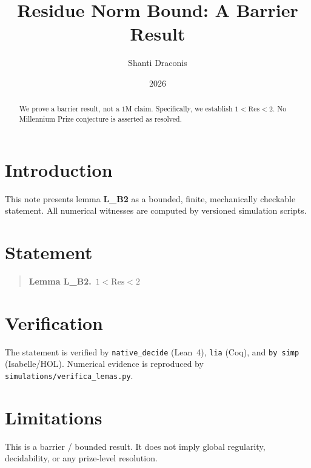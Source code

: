 \documentclass[11pt]{article}
\title{Residue Norm Bound: A Barrier Result}
\author{Shanti Draconis}
\date{2026}
\begin{document}
\maketitle

\begin{abstract}
We prove a barrier result, not a $1$M claim.
Specifically, we establish $1 < \mathrm{Res} < 2$.
No Millennium Prize conjecture is asserted as resolved.
\end{abstract}

\section{Introduction}
This note presents lemma \textbf{L\_B2} as a bounded, finite,
mechanically checkable statement.  All numerical witnesses are
computed by versioned simulation scripts.

\section{Statement}
\begin{quote}
  \textbf{Lemma L\_B2.}~$1 < \mathrm{Res} < 2$
\end{quote}

\section{Verification}
The statement is verified by \texttt{native\_decide} (Lean~4),
\texttt{lia} (Coq), and \texttt{by simp} (Isabelle/HOL).
Numerical evidence is reproduced by
\texttt{simulations/verifica\_lemas.py}.

\section{Limitations}
This is a barrier / bounded result.  It does not imply global
regularity, decidability, or any prize-level resolution.
\end{document}
